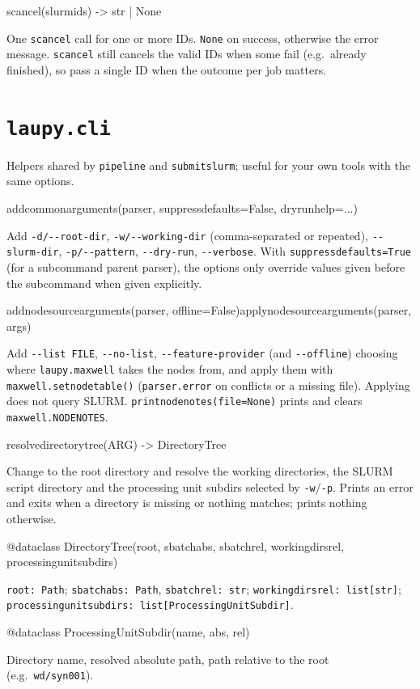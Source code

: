 \documentclass[11pt,a4paper]{article}
\newcommand{\api}[1]{%
  \par\medskip
  \begin{tcolorbox}[colback=sigbg, colframe=sigbg, boxrule=0pt, arc=1pt, left=4pt, right=4pt, top=2pt, bottom=2pt, breakable]
  \raggedright\ttfamily\small #1
  \end{tcolorbox}\nopagebreak\vspace{-4pt}%
}
\DeclareRobustCommand{\_}{\textunderscore\allowbreak}
\newcommand{\cmd}[1]{\texttt{#1}}
\begin{document}
\api{scancel(slurm\_ids) -> str | None}
One \cmd{scancel} call for one or more IDs. \cmd{None} on success, otherwise the error message.
\cmd{scancel} still cancels the valid IDs when some fail (e.g.\ already finished), so pass a single
ID when the outcome per job matters.

\section{\texorpdfstring{\cmd{laupy.cli}}{laupy.cli}}

Helpers shared by \cmd{pipeline} and \cmd{submitslurm}; useful for your own tools with the same
options.

\api{add\_common\_arguments(parser, suppress\_defaults=False, dry\_run\_help=...)}
Add \cmd{-d/-{}-root-dir}, \cmd{-w/-{}-working-dir} (comma-separated or repeated),
\cmd{-{}-slurm-dir}, \cmd{-p/-{}-pattern}, \cmd{-{}-dry-run}, \cmd{-{}-verbose}. With
\cmd{suppress\_defaults=True} (for a subcommand parent parser), the options only override values
given before the subcommand when given explicitly.

\api{add\_node\_source\_arguments(parser, offline=False)\quad apply\_node\_source\_arguments(parser, args)}
Add \cmd{-{}-list FILE}, \cmd{-{}-no-list}, \cmd{-{}-feature-provider} (and \cmd{-{}-offline}) choosing where
\cmd{laupy.maxwell} takes the nodes from, and apply them with \cmd{maxwell.set\_node\_table()}
(\cmd{parser.error} on conflicts or a missing file). Applying does not query SLURM.
\cmd{print\_node\_notes(file=None)} prints and clears \cmd{maxwell.NODE\_NOTES}.

\api{resolve\_directory\_tree(ARG) -> DirectoryTree}
Change to the root directory and resolve the working directories, the SLURM script directory and
the processing unit subdirs selected by \cmd{-w}/\cmd{-p}. Prints an error and exits when a
directory is missing or nothing matches; prints nothing otherwise.

\api{@dataclass DirectoryTree(root, sbatch\_abs, sbatch\_rel, working\_dirs\_rel, processing\_unit\_subdirs)}
\cmd{root: Path}; \cmd{sbatch\_abs: Path}, \cmd{sbatch\_rel: str}; \cmd{working\_dirs\_rel: list[str]};
\cmd{processing\_unit\_subdirs: list[ProcessingUnitSubdir]}.

\api{@dataclass ProcessingUnitSubdir(name, abs, rel)}
Directory name, resolved absolute path, path relative to the root (e.g.\ \cmd{wd/syn001}).
\end{document}
